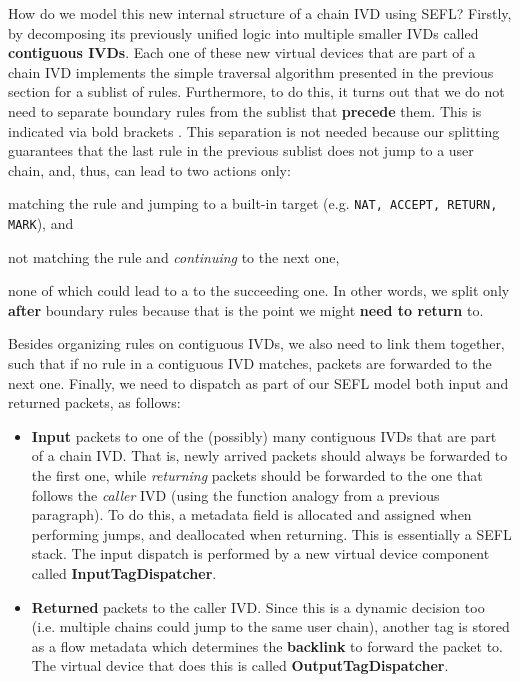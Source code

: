 How do we model this new internal structure of a chain IVD using SEFL?
Firstly, by decomposing its previously unified logic into multiple smaller IVDs
called \textbf{contiguous IVDs}. Each one of these new virtual devices that are
part of a chain IVD implements the simple traversal algorithm presented in the
previous section for a sublist of rules.  Furthermore, to do this, it turns out
that we do not need to separate boundary rules from the sublist that
\textbf{precede} them.  This is indicated via bold brackets
.  This separation is not needed
because our splitting guarantees that the last rule in the previous sublist
does not jump to a user chain, and, thus, can lead to two actions only:
\begin{enumerate*}[a)]
  \item matching the rule and jumping to a built-in target (e.g. \texttt{NAT,
    ACCEPT, RETURN, MARK}), and
  \item not matching the rule and \emph{continuing} to the next one,
\end{enumerate*}
none of which could lead to a \RETURN to the succeeding one.  In other words,
we split only \textbf{after} boundary rules because that is the point we might
\textbf{need to return} to.

Besides organizing rules on contiguous IVDs, we also need to link them
together, such that if no rule in a contiguous IVD matches, packets are
forwarded to the next one.  Finally, we need to dispatch as part of our SEFL
model both input and returned packets, as follows:
\begin{itemize}
  \item \textbf{Input} packets to one of the (possibly) many contiguous IVDs
    that are part of a chain IVD.  That is, newly arrived packets should always
    be forwarded to the first one, while \emph{returning} packets should be
    forwarded to the one that follows the \emph{caller} IVD (using the function
    analogy from a previous paragraph).  To do this, a metadata field is
    allocated and assigned when performing jumps, and deallocated when
    returning.  This is essentially a SEFL stack.  The input dispatch is
    performed by a new virtual device component called
    \textbf{InputTagDispatcher}.
  \item \textbf{Returned} packets to the caller IVD. Since this is a dynamic
    decision too (i.e. multiple chains could jump to the same user chain),
    another tag is stored as a flow metadata which determines the
    \textbf{backlink} to forward the packet to.  The virtual device that does
    this is called \textbf{OutputTagDispatcher}.
\end{itemize}

